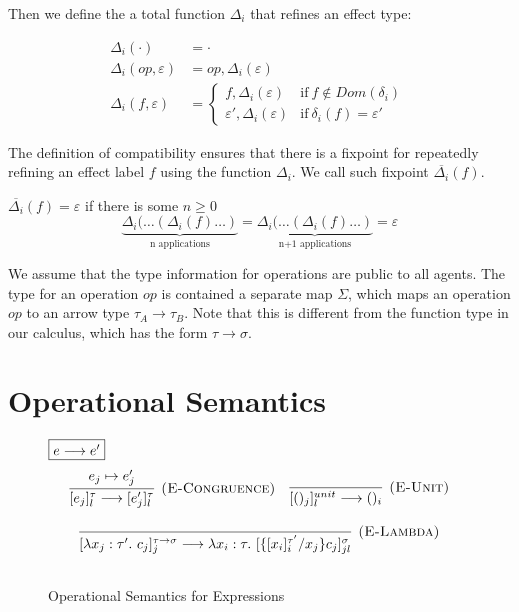 Then we define the a total function $\Delta_i$ that refines an effect type:
\begin{definition}
\begin{align*}
\Delta_i(\cdot) &= \cdot \\
\Delta_i(op, \varepsilon) &= op, \Delta_i(\varepsilon) \\
\Delta_i(f, \varepsilon) &= 
    \begin{cases}
      f, \Delta_i(\varepsilon) & \text{if}\ f \not\in Dom(\delta_i)  \ \\
      \varepsilon', \Delta_i(\varepsilon) & \text{if}\ \delta_i(f) = \varepsilon'
    \end{cases}
\end{align*}
\end{definition}

The definition of compatibility ensures that there is a fixpoint for repeatedly refining an effect label $f$ using the function $\Delta_i$. We call such fixpoint $\overline{\Delta_i}(f)$.

\begin{definition}
$\overline{\Delta_i}(f) = \varepsilon$ if there is some $n \geq 0$
\[
    \underbrace{\Delta_i(\dots (\Delta_i(f) \dots )}_\text{n applications}   = 
    \underbrace{\Delta_i(\dots (\Delta_i(f) \dots )}_\text{n+1 applications}   = \varepsilon
 \]
 \end{definition}
 
 We assume that the type information for operations are public to all agents. The type  for an operation $op$ is contained a separate map $\Sigma$, which maps an operation $op$ to an arrow type $\tau_A \rightarrow \tau_B$. Note that this is different from the function type in our calculus, which has the form $\tau \rightarrow \sigma$.




\section{Operational Semantics}
\begin{figure}[t]
\footnotesize{


$\fbox{$e \longrightarrow e'$}$
\[
\begin{array}{c}
\infer[\textsc{(E-Congruence)}]
  {[e_j]^\tau_l \longrightarrow [e_j']^\tau_l}
  {e_j \mapsto e_j'} \quad 

\infer[\textsc{(E-Unit)}]
  {[()_j]^{unit}_l \longrightarrow ()_i}
  {} \\[3ex]
  
\infer[\textsc{(E-Lambda)}]
  {[\lambda x_j : \tau'.\ c_j]^{\tau \rightarrow \sigma}_{j} \longrightarrow \lambda x_i : \tau.\ [\{[x_i]^{\tau'}_{i}/x_j\}c_j]^\sigma_{jl}}
  {} \\[3ex]
\end{array}
\]
}
\caption{Operational Semantics for Expressions}
\label{fig-op1}

\end{figure}

